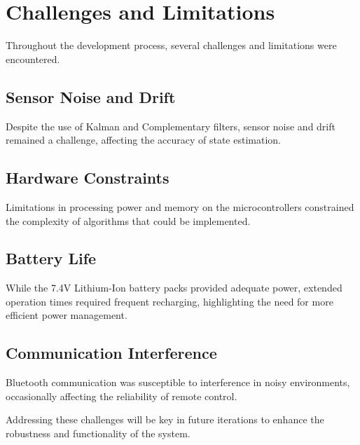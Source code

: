 \section{Challenges and Limitations}

Throughout the development process, several challenges and limitations were encountered.

\subsection{Sensor Noise and Drift}
Despite the use of Kalman and Complementary filters, sensor noise and drift remained a challenge, affecting the accuracy of state estimation.

\subsection{Hardware Constraints}
Limitations in processing power and memory on the microcontrollers constrained the complexity of algorithms that could be implemented.

\subsection{Battery Life}
While the 7.4V Lithium-Ion battery packs provided adequate power, extended operation times required frequent recharging, highlighting the need for more efficient power management.

\subsection{Communication Interference}
Bluetooth communication was susceptible to interference in noisy environments, occasionally affecting the reliability of remote control.

Addressing these challenges will be key in future iterations to enhance the robustness and functionality of the system.

